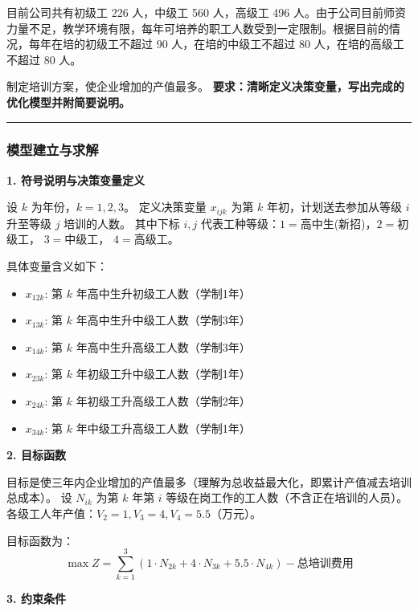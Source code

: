 \documentclass[a4paper,12pt]{ctexart} %
\begin{document}
	目前公司共有初级工 226 人，中级工 560 人，高级工 496 人。由于公司目前师资力量不足，教学环境有限，每年可培养的职工人数受到一定限制。根据目前的情况，每年在培的初级工不超过 90 人，在培的中级工不超过 80 人，在培的高级工不超过 80 人。
	
	制定培训方案，使企业增加的产值最多。
	\textbf{要求：清晰定义决策变量，写出完成的优化模型并附简要说明。}
	
	\vspace{1cm} %
	
	
	\hrule
	\vspace{0.5cm}
	
	\subsubsection*{模型建立与求解}
	
	\textbf{1. 符号说明与决策变量定义}
	
	设 $k$ 为年份，$k=1, 2, 3$。
	定义决策变量 $x_{ijk}$ 为第 $k$ 年初，计划送去参加从等级 $i$ 升至等级 $j$ 培训的人数。
	其中下标 $i, j$ 代表工种等级：$1=$高中生(新招)，$2=$初级工， $3=$中级工， $4=$高级工。
	
	具体变量含义如下：
	\begin{itemize}
		\item $x_{12k}$: 第 $k$ 年高中生升初级工人数（学制1年）
		\item $x_{13k}$: 第 $k$ 年高中生升中级工人数（学制3年）
		\item $x_{14k}$: 第 $k$ 年高中生升高级工人数（学制3年）
		\item $x_{23k}$: 第 $k$ 年初级工升中级工人数（学制1年）
		\item $x_{24k}$: 第 $k$ 年初级工升高级工人数（学制2年）
		\item $x_{34k}$: 第 $k$ 年中级工升高级工人数（学制1年）
	\end{itemize}
	
	\textbf{2. 目标函数}
	
	目标是使三年内企业增加的产值最多（理解为总收益最大化，即累计产值减去培训总成本）。
	设 $N_{ik}$ 为第 $k$ 年第 $i$ 等级在岗工作的工人数（不含正在培训的人员）。
	各级工人年产值：$V_2=1, V_3=4, V_4=5.5$（万元）。
	
	目标函数为：
	\[
	\max Z = \sum_{k=1}^3 (1 \cdot N_{2k} + 4 \cdot N_{3k} + 5.5 \cdot N_{4k}) - \text{总培训费用}
	\]
	
	\textbf{3. 约束条件}
	
\end{document}
